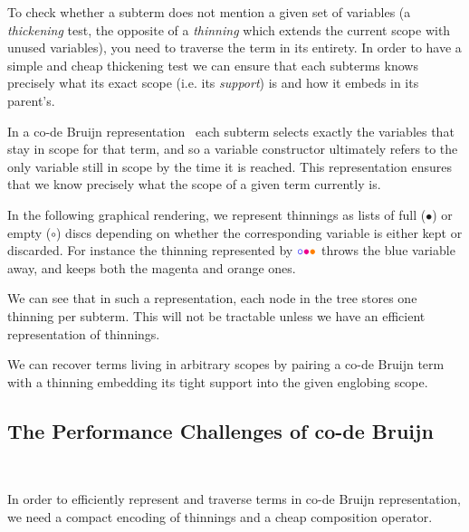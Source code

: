 
To check whether a subterm does not mention a given set of variables
(a \emph{thickening} test, the opposite of a \emph{thinning} which extends the
current scope with unused variables), you need to traverse the term in its entirety.
%
In order to have a simple and cheap thickening test we can ensure that each subterms
knows precisely what its exact scope (i.e. its \emph{support}) is and how it embeds
in its parent's.

In a co-de Bruijn
representation~\cite{DBLP:journals/corr/abs-1807-04085} each subterm
selects exactly the variables that stay in scope for that term,
and so a variable constructor ultimately refers to the only variable still
in scope by the time it is reached.
%
This representation ensures that we know precisely what the scope of a given term
currently is.

In the following graphical rendering, we represent thinnings as lists of full
($\bullet$) or empty ($\circ$) discs depending on whether the corresponding
variable is either kept or discarded.
For instance the thinning represented by
$\color{blue}{\circ}\color{magenta}{\bullet}\color{orange}{\bullet}$
throws the {\color{blue}blue} variable away, and keeps both the
{\color{magenta}magenta} and {\color{orange}orange} ones.


We can see that in such a representation, each node in the tree stores one
thinning per subterm. This will not be tractable unless we have an efficient
representation of thinnings.

We can recover terms living in arbitrary scopes by pairing a co-de Bruijn term
with a thinning embedding its tight support into the given englobing scope.

\subsection{The Performance Challenges of co-de Bruijn}~\label{sec:thinningsintypos}


In order to efficiently represent and traverse terms in co-de Bruijn representation,
we need a compact encoding of thinnings and a cheap composition operator.

\begin{minipage}{.45\textwidth}\center
\end{minipage}\hfill
\begin{minipage}{.45\textwidth}\center
\end{minipage}

